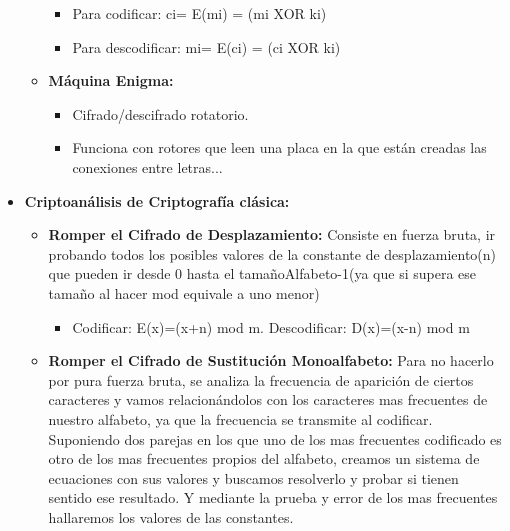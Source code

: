 \documentclass[12pt, twoside, openright]{report} %
\begin{document}
\begin{itemize}
\begin{itemize}
\begin{itemize}
      \item Para codificar: ci= E(mi) = (mi XOR ki)
        
      \item Para descodificar: mi= E(ci) = (ci XOR ki)
        
      \end{itemize}
    \item \textbf{Máquina Enigma:}
      

      \begin{itemize}
      \item Cifrado/descifrado rotatorio.
        
      \item Funciona con rotores que leen una placa en la que están creadas
        las conexiones entre letras...
        
      \end{itemize}
    \end{itemize}
  \item \textbf{Criptoanálisis de Criptografía clásica:}
    

    \begin{itemize}
    \item \textbf{Romper el Cifrado de Desplazamiento:} Consiste en fuerza
      bruta, ir probando todos los posibles valores de la constante de
      desplazamiento(n) que pueden ir desde 0 hasta el
      tamañoAlfabeto-1(ya que si supera ese tamaño al hacer mod equivale
      a uno menor)
      

      \begin{itemize}
      \item Codificar: E(x)=(x+n) mod m. Descodificar: D(x)=(x-n) mod m
        
      \end{itemize}
    \item \textbf{Romper el Cifrado de Sustitución Monoalfabeto:} Para no
      hacerlo por pura fuerza bruta, se analiza la frecuencia de
      aparición de ciertos caracteres y vamos relacionándolos con los
      caracteres mas frecuentes de nuestro alfabeto, ya que la
      frecuencia se transmite al codificar. Suponiendo dos parejas en
      los que uno de los mas frecuentes codificado es otro de los mas
      frecuentes propios del alfabeto, creamos un sistema de ecuaciones
      con sus valores y buscamos resolverlo y probar si tienen sentido
      ese resultado. Y mediante la prueba y error de los mas frecuentes
      hallaremos los valores de las constantes.
      


\end{itemize}
\end{itemize}
\end{document}
